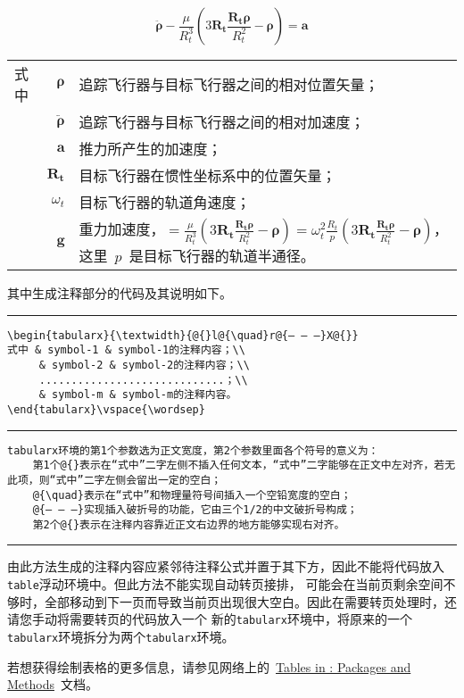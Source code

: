 \begin{equation}\label{eq:1}
\ddot{\boldsymbol{\rho}}-\frac{\mu}{R_{t}^{3}}\left(3\mathbf{R_{t}}\frac{\mathbf{R_{t}\rho}}{R_{t}^{2}}-\boldsymbol{\rho}\right)=\mathbf{a}
\end{equation}
\begin{tabularx}{\textwidth}{@{}l@{\quad}r@{———}X@{}}
式中& $\bm{\rho}$ &追踪飞行器与目标飞行器之间的相对位置矢量；\\
&  $\bm{\ddot{\rho}}$&追踪飞行器与目标飞行器之间的相对加速度；\\
&  $\mathbf{a}$   &推力所产生的加速度；\\
&  $\mathbf{R_t}$ & 目标飞行器在惯性坐标系中的位置矢量；\\
&  $\omega_{t}$ & 目标飞行器的轨道角速度；\\
&  $\mathbf{g}$ & 重力加速度，$=\frac{\mu}{R_{t}^{3}}\left(
3\mathbf{R_{t}}\frac{\mathbf{R_{t}\rho}}{R_{t}^{2}}-\bm{\rho}\right)=\omega_{t}^{2}\frac{R_{t}}{p}\left(
3\mathbf{R_{t}}\frac{\mathbf{R_{t}\rho}}{R_{t}^{2}}-\bm{\rho}\right)$，这里~$p$~是目标飞行器的轨道半通径。
\end{tabularx}\vspace{\wordsep}

其中生成注释部分的代码及其说明如下。
\vspace{1em}\noindent\hrule
\begin{verbatim}
\begin{tabularx}{\textwidth}{@{}l@{\quad}r@{— — —}X@{}}
式中 & symbol-1 & symbol-1的注释内容；\\
     & symbol-2 & symbol-2的注释内容；\\
     .............................；\\
     & symbol-m & symbol-m的注释内容。
\end{tabularx}\vspace{\wordsep}
\end{verbatim}
\noindent\hrule
\begin{verbatim}
tabularx环境的第1个参数选为正文宽度，第2个参数里面各个符号的意义为：
    第1个@{}表示在“式中”二字左侧不插入任何文本，“式中”二字能够在正文中左对齐，若无此项，则“式中”二字左侧会留出一定的空白；
    @{\quad}表示在“式中”和物理量符号间插入一个空铅宽度的空白；
    @{— — —}实现插入破折号的功能，它由三个1/2的中文破折号构成；
    第2个@{}表示在注释内容靠近正文右边界的地方能够实现右对齐。
\end{verbatim}
\noindent\hrule\vspace{1em}
由此方法生成的注释内容应紧邻待注释公式并置于其下方，因此不能将代码放入\verb|table|浮动环境中。但此方法不能实现自动转页接排，
可能会在当前页剩余空间不够时，全部移动到下一页而导致当前页出现很大空白。因此在需要转页处理时，还请您手动将需要转页的代码放入一个
新的\verb|tabularx|环境中，将原来的一个\verb|tabularx|环境拆分为两个\verb|tabularx|环境。

若想获得绘制表格的更多信息，请参见网络上的~\href{http://www.tug.org/pracjourn/2007-1/mori/}{Tables in \LaTeXe: Packages and Methods}~文档。 